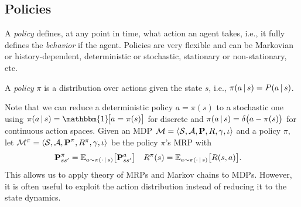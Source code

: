 		\subsection{Policies}
			A \emph{policy} defines, at any point in time, what action an agent takes, i.e., it fully defines the \emph{behavior} if the agent. Policies are very flexible and can be Markovian or history-dependent, deterministic or stochastic, stationary or non-stationary, etc.
			\begin{definition}[Policy]
				A \emph{policy} \(\pi\) is a distribution over actions given the state \(s\), i.e., \( \pi(a \,\vert\, s) = P(a \,\vert\, s) \).
			\end{definition}
			Note that we can reduce a deterministic policy \( a = \pi(s) \) to a stochastic one using \( \pi(a \given s) = \mathbbm{1}\!\bigl[ a = \pi(s) \bigr] \) for discrete and \( \pi(a \,\vert\, s) = \delta\bigl( a - \pi(s) \bigr) \) for continuous action spaces. Given an \ac{MDP} \( \mathcal{M} = \langle \mathcal{S}, \mathcal{A}, \bm{\mathrm{P}}, R, \gamma, \iota \rangle \) and a policy \(\pi\), let \( \mathcal{M}^\pi = \langle \mathcal{S}, \mathcal{A}, \bm{\mathrm{P}}^\pi, R^\pi, \gamma, \iota \rangle \) be the policy \(\pi\)'s \ac{MRP} with
			\begin{align}
				\bm{\mathrm{P}}_{ss'}^\pi &= \mathbb{E}_{a \sim \pi(\cdot \,\vert\, s)}\bigl[ \bm{\mathrm{P}}_{ss'}^a \bigr] &
				R^\pi(s) &= \mathbb{E}_{a \sim \pi(\cdot \,\vert\, s)}\bigl[ R(s, a) \bigr].
				\label{eq:mdpToMrp}
			\end{align}
			This allows us to apply theory of \acp{MRP} and Markov chains to \acp{MDP}. However, it is often useful to exploit the action distribution instead of reducing it to the state dynamics.

